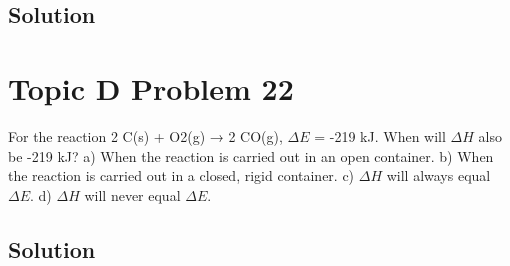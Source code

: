 \documentclass[10pt]{article}
\begin{document}
        \subsection{Solution}

    \pagebreak
    \section{Topic D Problem 22}
        For the reaction 2 C(s) + O2(g) → 2 CO(g), $\Delta E$ = -219 kJ. When will $\Delta H$ also be -219 kJ?
a) When the reaction is carried out in an open container.
b) When the reaction is carried out in a closed, rigid container.
c) $\Delta H$ will always equal $\Delta E$.
d) $\Delta H$ will never equal $\Delta E$.
        
        \subsection{Solution}
\end{document}
